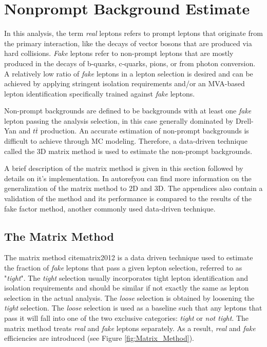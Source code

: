 \chapter{Nonprompt Background Estimate}
\label{chap:Nonprompt}

In this analysis, the term \emph{real} leptons refers to prompt leptons that originate from the primary interaction, like the decays of vector bosons that are produced via hard collisions. \emph{Fake} leptons refer to non-prompt leptons that are mostly produced in the decays of b-quarks, c-quarks, pions, or from photon conversion. A relatively low ratio of \emph{fake} leptons in a lepton selection is desired and can be achieved by applying stringent isolation requirements and/or an MVA-based lepton identification specifically trained against \emph{fake} leptons. 

Non-prompt backgrounds are defined to be backgrounds with at least one \emph{fake} lepton passing the analysis selection, in this case generally dominated by Drell-Yan and $t\bar{t}$ production. An accurate estimation of non-prompt backgrounds is difficult to achieve through MC modeling. Therefore, a data-driven technique called the $3$D matrix method is used to estimate the non-prompt backgrounds. 

A brief description of the matrix method is given in this section followed by details on it's implementation. In autorefyou can find more information on the generalization of the matrix method to $2$D and $3$D. The appendices also contain a validation of the method and its performance is compared to the results of the fake factor method, another commonly used data-driven technique.
\section{The Matrix Method}
\label{sec:MM}

The matrix method cite{matrix2012} is a data driven technique used to estimate the fraction of \emph{fake} leptons that pass a given lepton selection, referred to as "\emph{tight}". The \emph{tight} selection usually incorporates tight lepton identification and isolation requirements and should be similar if not exactly the same as lepton selection in the actual analysis. The \emph{loose} selection is obtained by loosening the \emph{tight} selection. The \emph{loose} selection is used as a baseline such that any leptons that pass it will fall into one of the two exclusive categories: \emph{tight} or \emph{not tight}. The matrix method treats \emph{real} and \emph{fake} leptons separately. As a result, \emph{real} and \emph{fake} efficiencies are introduced (see Figure \ref{fig:Matrix_Method}).

